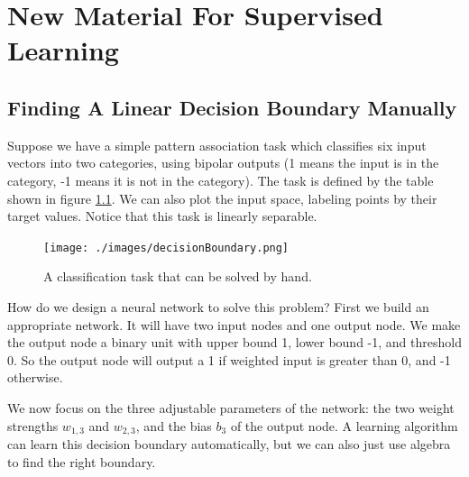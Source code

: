 \chapter{New Material For Supervised Learning}

\section{Finding A Linear Decision Boundary Manually}

Suppose we have a simple pattern association task which classifies six input vectors into two categories, using bipolar outputs (1 means the input is in the category, -1 means it is not in the category). The task is defined by the table shown in  figure \ref{simpleTask}.  We can also plot the input space, labeling points by their target values. Notice that this task is linearly separable. 

\begin{figure}[h]
\centering
\texttt{[image: ./images/decisionBoundary.png]}
\caption{A classification task that can be solved by hand.}
\label{simpleTask}
\end{figure}

How do we design a neural network to solve this problem? First we build an appropriate network. It will have two input nodes and one output node. We make the output node a binary unit with upper bound 1, lower bound -1, and threshold 0. So the output node will output a 1 if weighted input is greater than 0, and -1 otherwise.

We now focus on the three adjustable parameters of the network: the two weight strengths $w_{1,3}$ and $w_{2,3}$, and the bias $b_3$ of the output node. A learning algorithm can learn this decision boundary automatically, but we can also just use algebra to find the right boundary.


